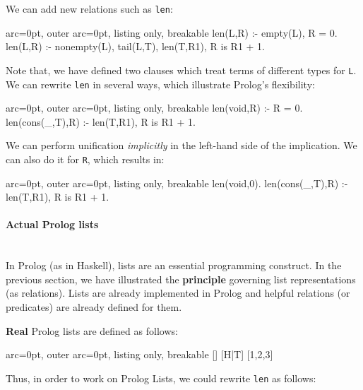 We can add new relations such as \texttt{len}:

\begin{tcblisting}{ arc=0pt, outer arc=0pt, listing only, breakable}
len(L,R) :- empty(L), R = 0.
len(L,R) :- nonempty(L), tail(L,T), len(T,R1), R is R1 + 1.

\end{tcblisting}


Note that, we have defined two clauses which treat terms of different types for \texttt{L}. We can rewrite \texttt{len} in several ways, which illustrate Prolog's flexibility:


\begin{tcblisting}{ arc=0pt, outer arc=0pt, listing only, breakable}
len(void,R) :- R = 0.
len(cons(_,T),R) :- len(T,R1), R is R1 + 1.

\end{tcblisting}


We can perform unification \textit{implicitly} in the left-hand side of the implication. We can also do it for \texttt{R}, which results in:


\begin{tcblisting}{ arc=0pt, outer arc=0pt, listing only, breakable}
len(void,0).
len(cons(_,T),R) :- len(T,R1), R is R1 + 1.

\end{tcblisting}


\paragraph{ Actual Prolog lists }\hfill\\

In Prolog (as in Haskell), lists are an essential programming construct. In the previous section, we have illustrated the \textbf{principle} governing list representations (as relations). Lists are already implemented in Prolog and helpful relations (or predicates) are already defined for them.

\textbf{Real} Prolog lists are defined as follows:

\begin{tcblisting}{ arc=0pt, outer arc=0pt, listing only, breakable}
[] %
[H|T] %
[1,2,3] %

\end{tcblisting}


Thus, in order to work on Prolog Lists, we could rewrite \texttt{len} as follows:


